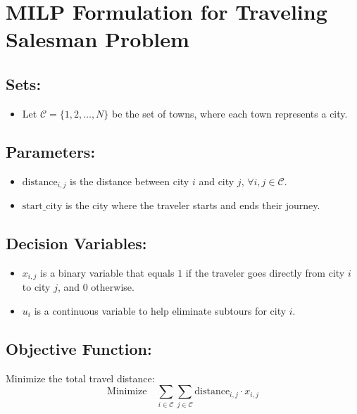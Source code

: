 \documentclass{article}
\begin{document}
\section*{MILP Formulation for Traveling Salesman Problem}

\subsection*{Sets:}
\begin{itemize}
    \item Let \( \mathcal{C} = \{1, 2, \ldots, N\} \) be the set of towns, where each town represents a city.
\end{itemize}

\subsection*{Parameters:}
\begin{itemize}
    \item \( \text{distance}_{i,j} \) is the distance between city \( i \) and city \( j \), \( \forall i, j \in \mathcal{C} \).
    \item \( \text{start\_city} \) is the city where the traveler starts and ends their journey.
\end{itemize}

\subsection*{Decision Variables:}
\begin{itemize}
    \item \( x_{i,j} \) is a binary variable that equals \( 1 \) if the traveler goes directly from city \( i \) to city \( j \), and \( 0 \) otherwise.
    \item \( u_i \) is a continuous variable to help eliminate subtours for city \( i \).
\end{itemize}

\subsection*{Objective Function:}
Minimize the total travel distance:
\[
\text{Minimize} \quad \sum_{i \in \mathcal{C}} \sum_{j \in \mathcal{C}} \text{distance}_{i,j} \cdot x_{i,j}
\]
\end{document}
